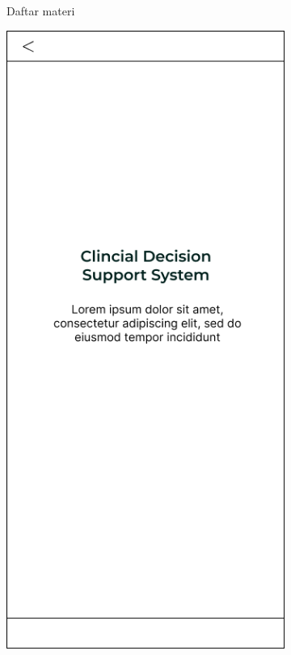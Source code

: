 \begin{figure}[H]
\begin{subfigure}[b]{0.3\textwidth}
	  \caption{Daftar materi}
	  \label{fig:ActivityMateri2}
	\end{subfigure}
	\begin{subfigure}[b]{0.3\textwidth}
		\centering
	  \includegraphics[width=\linewidth]{contents/chapter-3/images/MF-materi-2.png}

\end{subfigure}
\end{figure}
